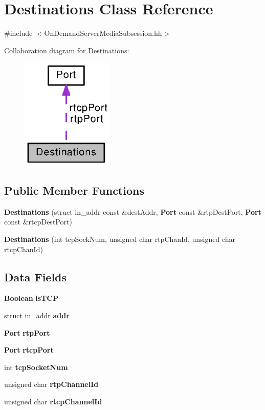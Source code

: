 \section{Destinations Class Reference}
\label{classDestinations}


{\ttfamily \#include $<$On\+Demand\+Server\+Media\+Subsession.\+hh$>$}



Collaboration diagram for Destinations\+:
\nopagebreak
\begin{figure}[H]
\begin{center}
\leavevmode
\includegraphics[width=125pt]{classDestinations__coll__graph}
\end{center}
\end{figure}
\subsection*{Public Member Functions}
\begin{DoxyCompactItemize}
\item 
{\bf Destinations} (struct in\+\_\+addr const \&dest\+Addr, {\bf Port} const \&rtp\+Dest\+Port, {\bf Port} const \&rtcp\+Dest\+Port)
\item 
{\bf Destinations} (int tcp\+Sock\+Num, unsigned char rtp\+Chan\+Id, unsigned char rtcp\+Chan\+Id)
\end{DoxyCompactItemize}
\subsection*{Data Fields}
\begin{DoxyCompactItemize}
\item 
{\bf Boolean} {\bf is\+T\+C\+P}
\item 
struct in\+\_\+addr {\bf addr}
\item 
{\bf Port} {\bf rtp\+Port}
\item 
{\bf Port} {\bf rtcp\+Port}
\item 
int {\bf tcp\+Socket\+Num}
\item 
unsigned char {\bf rtp\+Channel\+Id}
\item 
unsigned char {\bf rtcp\+Channel\+Id}
\end{DoxyCompactItemize}



